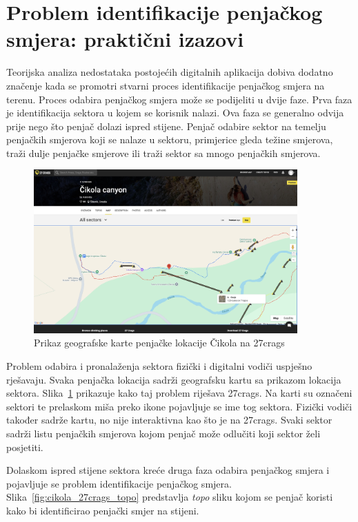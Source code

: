 \section{Problem identifikacije penjačkog smjera: praktični izazovi}

Teorijska analiza nedostataka postojećih digitalnih aplikacija dobiva dodatno značenje kada se promotri stvarni proces identifikacije penjačkog smjera na terenu. Proces odabira penjačkog smjera može se podijeliti u dvije faze. Prva faza je identifikacija sektora u kojem se korisnik nalazi. Ova faza se generalno odvija prije nego što penjač dolazi ispred stijene. Penjač odabire sektor na temelju penjačkih smjerova koji se nalaze u sektoru, primjerice gleda težine smjerova, traži dulje penjačke smjerove ili traži sektor sa mnogo penjačkih smjerova.
\begin{figure}[H]
    \centering
    \includegraphics[width=0.9\textwidth]{images/analiza/cikola_27crags_map.jpeg}
    \caption{Prikaz geografske karte penjačke lokacije Čikola na 27crags}
    \label{fig:cikola_27crags_map}
\end{figure} 
Problem odabira i pronalaženja sektora fizički i digitalni vodiči uspješno rješavaju. Svaka penjačka lokacija sadrži geografsku kartu sa prikazom lokacija sektora. Slika~\ref{fig:cikola_27crags_map} prikazuje kako taj problem riješava 27crags. Na karti su označeni sektori te prelaskom miša preko ikone pojavljuje se ime tog sektora. Fizički vodiči također sadrže kartu, no nije interaktivna kao što je na 27crags. Svaki sektor sadrži listu penjačkih smjerova kojom penjač može odlučiti koji sektor želi posjetiti.

Dolaskom ispred stijene sektora kreće druga faza odabira penjačkog smjera i pojavljuje se problem identifikacije penjačkog smjera. Slika~\ref{fig:cikola_27crags_topo} predstavlja \textit{topo} sliku kojom se penjač koristi kako bi identificirao penjački smjer na stijeni.


